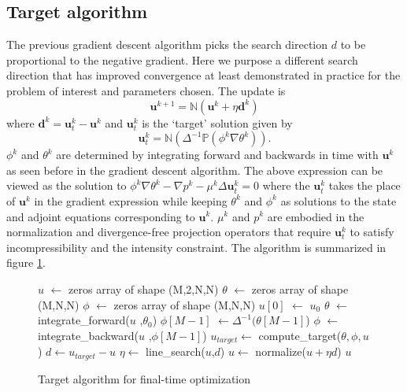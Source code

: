 \subsection{Target algorithm}
\label{sec:target_method}
The previous gradient descent algorithm picks the search direction $d$ to be proportional to the negative gradient. Here we purpose a different search direction that has improved convergence at least demonstrated in practice for the problem of interest and parameters chosen. The update is
\begin{equation}
\label{eq:target_update}
\mathbf{u}^{k+1} = \mathds{N}(\mathbf{u}^k + \eta \mathbf{d}^k)
\end{equation}
where $\mathbf{d}^k = \mathbf{u}_{t}^k - \mathbf{u}^k$ and $\mathbf{u}_t^k$ is the `target' solution given by 
\begin{equation}
\mathbf{u}_t^k = \mathds{N}(\Delta^{-1} \mathds{P}(\phi^{k} \nabla \theta^{k})).
\end{equation}
$\phi^{k}$ and $\theta^{k}$ are determined by integrating forward and backwards in time with $\mathbf{u}^{k}$ as seen before in the gradient descent algorithm. The above expression can be viewed as the solution to $ \phi^{k} \nabla\theta^{k} - \nabla p^{k} -\mu^{k} \Delta \mathbf{u}^{k}_t= 0$ where the $\mathbf{u}_t^{k}$ takes the place of $\mathbf{u}^{k}$ in the gradient expression while keeping $\theta^k$ and $\phi^{k}$ as solutions to the state and adjoint equations corresponding to $\mathbf{u}^{k}$. $\mu^{k}$ and $p^{k}$ are embodied in the normalization and divergence-free projection operators that require $\mathbf{u}_t^k$ to satisfy incompressibility and the intensity constraint. The algorithm is summarized in figure \ref{fig:target}.

\begin{figure}
\begin{algorithmic}[1]
\State$u$ $\gets$ zeros array of shape (M,2,N,N)
\State $\theta$ $\gets$ zeros array of shape (M,N,N)
\State $\phi$ $\gets$ zeros array of shape (M,N,N)
\State
\State $u[0]$ $\gets$ $u_0$
\State
	\State  $\theta$ $\gets$ integrate\_forward($u$ ,$\theta_0$)
	\State  $\phi[M-1]$  $\gets  \Delta^{-1}(\theta[M-1]$)
	\State $\phi$ $\gets$ integrate\_backward($u$ ,$\phi[M-1]$)
	\State
	\State  $u_{target} \gets$ compute\_target($\theta,\phi,u$)
	\State  $d \gets  u_{target} - u$
	\State $\eta  \gets$ line\_search($u$,$d$)
	\State $u \gets$ normalize($u + \eta d$)
\EndWhile
\State	
\Return $u$
\EndFunction
\end{algorithmic}
\caption{Target algorithm for final-time optimization}
\label{fig:target}
\end{figure}



